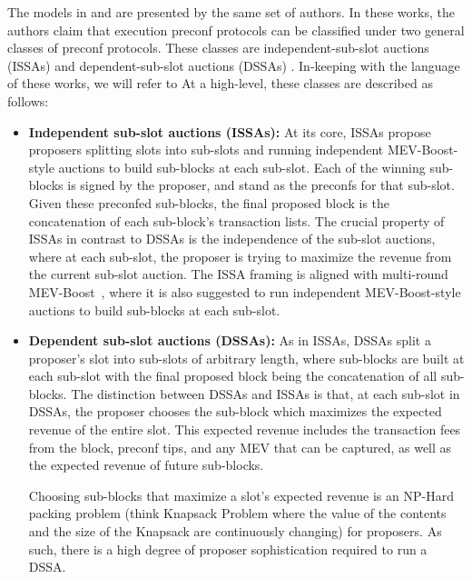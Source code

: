 \documentclass[a4paper]{article}
\theoremstyle{boldstyle}
\newcommand{\todoks}[1]{\todo[color=purple!40]{\textbf{Katerina:} #1}}
\begin{document}
    The models in \cite{W:EstimatingtheRevenuefromIndependentSub-SlotAuctionPreconfirmations} and  \cite{W:AnalysingExpectedProposerRevenuefromPreconfirmations} are presented by the same set of authors. In these works, the authors claim that execution preconf protocols can be classified under two general classes of preconf protocols.  
    These classes are independent-sub-slot auctions (ISSAs)  \cite{W:EstimatingtheRevenuefromIndependentSub-SlotAuctionPreconfirmations} and dependent-sub-slot auctions (DSSAs) \cite{W:AnalysingExpectedProposerRevenuefromPreconfirmations}. In-keeping with the language of these works, we will refer to At a high-level, these %
    classes are described as follows:
    \begin{itemize}
        \item \textbf{Independent sub-slot auctions (ISSAs):} At its core, ISSAs propose proposers splitting slots into sub-slots and running independent MEV-Boost-style auctions to build sub-blocks at each sub-slot.  %
        Each of the winning sub-blocks is signed by the proposer, and stand as the preconfs for that sub-slot. Given these preconfed sub-blocks, the final proposed block is the concatenation of each sub-block's transaction lists. The crucial property of ISSAs in contrast to DSSAs is the independence of the sub-slot auctions, where at each sub-slot, the proposer is trying to maximize the revenue from the current sub-slot auction. The ISSA framing is aligned with multi-round MEV-Boost~\cite{W:BasedPreconfirmationswithMulti-roundMEV-Boost}, where it is also suggested to run independent MEV-Boost-style auctions to build sub-blocks at each sub-slot.
        
        \item \textbf{Dependent sub-slot auctions (DSSAs):} As in ISSAs, DSSAs split a proposer's slot into sub-slots of arbitrary length, where sub-blocks are built at each sub-slot with the final proposed block being the concatenation of all sub-blocks. The distinction between DSSAs and ISSAs is that, at each sub-slot in DSSAs, the proposer chooses the sub-block which maximizes the expected revenue of the entire slot. This expected revenue includes the transaction fees from the block, preconf tips, and any MEV that can be captured, as well as the expected revenue of future sub-blocks.  
        
        Choosing sub-blocks that maximize a slot's expected revenue is an NP-Hard packing problem (think Knapsack Problem where the value of the contents and the size of the Knapsack are continuously changing) for proposers. As such, there is a high degree of proposer sophistication required to run a DSSA. 
    \end{itemize}
\end{document}
